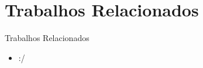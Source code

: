 \section{Trabalhos Relacionados}\label{sec:trabalhos}
\begin{frame}[allowframebreaks]{Trabalhos Relacionados}
	\begin{itemize}
		\setlength{\itemsep}{0.5em}
		\item :/
	\end{itemize}
\end{frame}